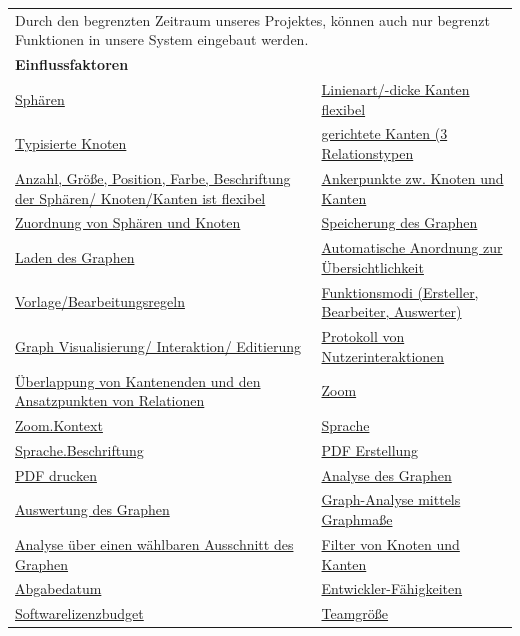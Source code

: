 \documentclass[enabledeprecatedfontcommands,fontsize=11pt,paper=a4,twoside]{scrartcl}
\newcounter{one}
\begin{document}
\newpage
\begin{tabular} {|p{8cm} p{8cm}|}
	\hline
	\rowcolor{prob}\multicolumn{2}{|l|}{\parbox{16cm}{\textbf{16: Begrenzter Funktionsumfang durch Bearbeitungszeit}}} \\  \hline\hline 
	\multicolumn{2}{|l|}{\parbox{16cm}{Durch den begrenzten Zeitraum unseres Projektes, können auch nur begrenzt Funktionen in unsere System eingebaut werden.}}\rule{0pt}{4ex}\\ [1ex] \hline
	\multicolumn{2}{|l|}{\textbf{Einflussfaktoren}}\\
	\hyperlink {n}{Sphären} &
	\hyperlink {o}{Linienart/-dicke Kanten flexibel}\\
	\hyperlink {p}{Typisierte Knoten} &
	\hyperlink {q}{gerichtete Kanten (3 Relationstypen} \\
	\hyperlink {r}{Anzahl, Größe, Position, Farbe, Beschriftung der Sphären/ Knoten/Kanten ist flexibel} &
	\hyperlink {s}{Ankerpunkte zw. Knoten und Kanten} \\
	\hyperlink {t}{Zuordnung von Sphären und Knoten} &
	\hyperlink {v}{Speicherung des Graphen} \\
	\hyperlink {w}{Laden des Graphen} &
	\hyperlink {x}{Automatische Anordnung zur Übersichtlichkeit} \\
	\hyperlink {y}{Vorlage/Bearbeitungsregeln} &
	\hyperlink {z}{Funktionsmodi (Ersteller, Bearbeiter, Auswerter)} \\
	\hyperlink {aa}{Graph Visualisierung/ Interaktion/ Editierung}&
	\hyperlink {bb}{Protokoll von Nutzerinteraktionen} \\
	\hyperlink {cc}{Überlappung von Kantenenden und den Ansatzpunkten von Relationen} &
	\hyperlink {ee}{Zoom} \\
	\hyperlink {ff}{Zoom.Kontext} &
	\hyperlink {gg}{Sprache} \\
	\hyperlink {hh}{Sprache.Beschriftung} &
	\hyperlink {kk}{PDF Erstellung} \\
	\hyperlink {ll}{PDF drucken} &
	\hyperlink {oo}{Analyse des Graphen} \\
	\hyperlink {pp}{Auswertung des Graphen} &
	\hyperlink {qq}{Graph-Analyse mittels Graphmaße} \\ 
	\hyperlink {rr}{Analyse über einen wählbaren Ausschnitt des Graphen} &
	\hyperlink {ss}{Filter von Knoten und Kanten} \\
	\hyperlink {uu}{Abgabedatum} &
	\hyperlink {vv}{Entwickler-Fähigkeiten} \\
	\hyperlink {ww}{Softwarelizenzbudget} &
	\hyperlink {xx}{Teamgröße} 
	\\ \hline

\end{tabular}
\end{document}
